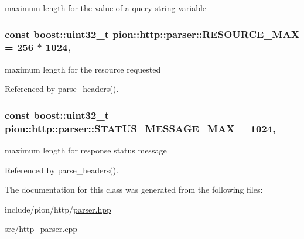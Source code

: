 maximum length for the value of a query string variable 

\hypertarget{classpion_1_1http_1_1parser_adf1d822b13731ee6430d5cfd8ad78a95}{
\subsubsection[{R\-E\-S\-O\-U\-R\-C\-E\-\_\-\-M\-A\-X}]{\setlength{\rightskip}{0pt plus 5cm}const boost\-::uint32\-\_\-t pion\-::http\-::parser\-::\-R\-E\-S\-O\-U\-R\-C\-E\-\_\-\-M\-A\-X = 256 $\ast$ 1024\hspace{0.3cm}{\ttfamily [static]}, {\ttfamily [protected]}}}\label{classpion_1_1http_1_1parser_adf1d822b13731ee6430d5cfd8ad78a95}


maximum length for the resource requested 



Referenced by parse\-\_\-headers().

\hypertarget{classpion_1_1http_1_1parser_a5480070912368dd015d72d54fcbece66}{
\subsubsection[{S\-T\-A\-T\-U\-S\-\_\-\-M\-E\-S\-S\-A\-G\-E\-\_\-\-M\-A\-X}]{\setlength{\rightskip}{0pt plus 5cm}const boost\-::uint32\-\_\-t pion\-::http\-::parser\-::\-S\-T\-A\-T\-U\-S\-\_\-\-M\-E\-S\-S\-A\-G\-E\-\_\-\-M\-A\-X = 1024\hspace{0.3cm}{\ttfamily [static]}, {\ttfamily [protected]}}}\label{classpion_1_1http_1_1parser_a5480070912368dd015d72d54fcbece66}


maximum length for response status message 



Referenced by parse\-\_\-headers().



The documentation for this class was generated from the following files\-:\begin{DoxyCompactItemize}
\item 
include/pion/http/\hyperlink{http_2parser_8hpp}{parser.\-hpp}\item 
src/\hyperlink{http__parser_8cpp}{http\-\_\-parser.\-cpp}\end{DoxyCompactItemize}
